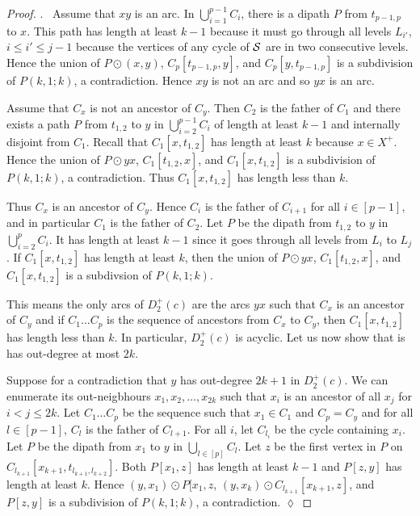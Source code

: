 \documentclass[utf8,10pt]{article}
\theoremstyle{plain}
\theoremstyle{definition}
\theoremstyle{remark}
\newenvironment{subproof}{\par\noindent {\it Subproof}.\ }{\hfill$\lozenge$\par\vspace{11pt}}
\begin{document}
\begin{proof}
\begin{subproof}
Assume that $xy$ is an arc.  In $\bigcup_{i=1}^{p-1} C_i$, there is a dipath $P$ from $t_{p-1,p}$ to $x$. This path has length at least $k-1$ because
it must go through all levels $L_{i'}$, $i\leq i'\leq j-1$ because the vertices of any cycle of ${\cal S}$ are in two consecutive levels.
Hence the union of $P\odot (x,y)$, $C_p[t_{p-1,p}, y]$, and  $C_p[y,t_{p-1,p}]$ is a subdivision of $P(k,1;k)$, a contradiction.
Hence $xy$ is not an arc and so $yx$ is an arc.


Assume that $C_x$ is  not an ancestor of $C_y$.  Then $C_2$ is the father of $C_1$
and there exists a path $P$ from $t_{1,2}$ to $y$ in $\bigcup_{i=2}^{p-1} C_i$ of length at least $k-1$ and 
internally disjoint from $C_1$. Recall that  $C_1[x,t_{1,2}]$ has length at least $k$ because $x\in X^+$. Hence the union of $P \odot yx$, $C_1[t_{1,2},x]$, and $C_1[x,t_{1,2}]$ is a subdivision of  $P(k,1;k)$, a contradiction. Thus $C_1[x,t_{1,2}]$ has length less than $k$.

Thus $C_x$ is an ancestor of $C_y$.  Hence $C_i$ is the father of $C_{i+1}$ for all $i \in [p-1]$, and 
in particular $C_1$ is the father of $C_2$. Let $P$ be the dipath from $t_{1,2}$ 
to $y$ in $\bigcup_{i=2}^{p} C_i$. It has length at least $k-1$ since it goes through all levels from $L_i$ to $L_j$.
If $C_1[x,t_{1,2}]$ has length at least $k$, then 
the union of $P \odot yx$, $C_1[t_{1,2},x]$, and $C_1[x,t_{1,2}]$  is a subdivsion of  $P(k,1;k)$.

This means the only arcs of $D^+_2(c)$ are the arcs $yx$ such that $C_x$ is an ancestor of $C_y$ and if $C_1 \dots C_p$ is the
sequence of ancestors from $C_x$ to $C_y$, then $C_1[x,t_{1,2}]$ has length less than $k$. 
In particular, $D^+_2(c)$ is acyclic. Let us now show that is has out-degree at most $2k$.


Suppose for a contradiction that  $y$ has out-degree $2k+1$ in $D^+_2(c)$. We can enumerate its out-neigbhours $x_1, x_2, \dots, x_{2k}$ such that $x_i$ is an ancestor of all $x_j$ for $i<j \leq 2k$. Let $C_1 \dots C_p$ be  the sequence such that $x_1\in C_1$ and $C_p = C_y$ and for all $l\in [p-1]$, $C_l$ is the father of $C_{l+1}$.
For all $i$, let $C_{l_i}$ be the cycle containing $x_i$.
 Let $P$ be the dipath from $x_1$ to $y$ in $\bigcup_{l\in [p]}C_l$. Let $z$ be the first vertex in $P$ on $C_{l_{k+1}}[x_{k+1}, t_{l_{k+1},l_{k+2}}]$.
 Both $P[x_1, z]$ has length at least $k-1$ and $P[z, y]$ has length at least $k$. Hence $(y,x_1) \odot P[x_1, z$, $(y,x_k)\odot C_{l_{k+1}}[x_{k+1},z]$, and $P[z, y]$ is a subdivision of $P(k,1;k)$, a contradiction.
\end{subproof}




\end{proof}
\end{document}
